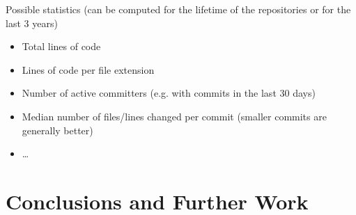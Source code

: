 \documentclass[runningheads,a4paper]{llncs}
\begin{document}
Possible statistics (can be computed for the lifetime of the repositories or for the last 3 years)
\begin{itemize}
  \item Total lines of code
  \item Lines of code per file extension 
  \item Number of active committers (e.g. with commits in the last 30 days)
  \item Median number of files/lines changed per commit (smaller commits are generally better)
  \item \ldots
\end{itemize}

\section{Conclusions and Further Work}




\end{document}
